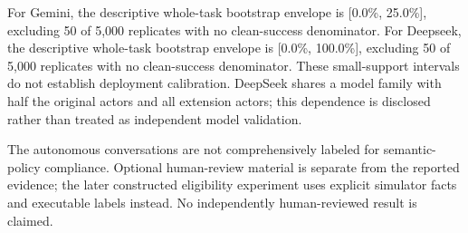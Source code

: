 For Gemini, the descriptive whole-task bootstrap envelope is [0.0\%, 25.0\%], excluding 50 of 5,000 replicates with no clean-success denominator. For Deepseek, the descriptive whole-task bootstrap envelope is [0.0\%, 100.0\%], excluding 50 of 5,000 replicates with no clean-success denominator. These small-support intervals do not establish deployment calibration. DeepSeek shares a model family with half the original actors and all extension actors; this dependence is disclosed rather than treated as independent model validation.

The autonomous conversations are not comprehensively labeled for semantic-policy compliance. Optional human-review material is separate from the reported evidence; the later constructed eligibility experiment uses explicit simulator facts and executable labels instead. No independently human-reviewed result is claimed.
